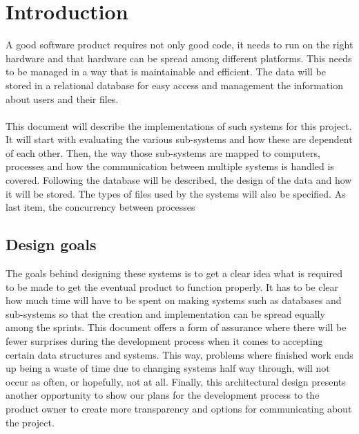 \section{Introduction}
A good software product requires not only good code, it needs to run on the right hardware and that hardware can be spread among different platforms. This needs to be managed in a way that is maintainable and efficient. The data will be stored in a relational database for easy access and management the information about users and their files.
\paragraph{}
This document will describe the implementations of such systems for this project. It will start with evaluating the various sub-systems and how these are dependent of each other. Then, the way those sub-systems are mapped to computers, processes and how the communication between multiple systems is handled is covered. 
Following the database will be described, the design of the data and how it will be stored. The types of files used by the systems will also be specified. 
As last item, the concurrency between processes 
\subsection{Design goals}
The goals behind designing these systems is to get a clear idea what is required to be made to get the eventual product to function properly. It has to be clear how much time will have to be spent on making systems such as databases and sub-systems so that the creation and implementation can be spread equally among the sprints. This document offers a form of assurance where there will be fewer surprises during the development process when it comes to accepting certain data structures and systems. This way, problems where finished work ends up being a waste of time due to changing systems half way through, will not occur as often, or hopefully, not at all.
Finally, this architectural design presents another opportunity to show our plans for the development process to the product owner to create more transparency and options for communicating about the project.


